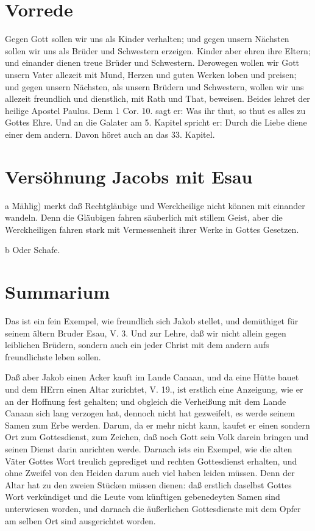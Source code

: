 \section{Vorrede}

Gegen Gott sollen wir uns als Kinder verhalten; und gegen unsern Nächsten sollen wir uns als Brüder und Schwestern erzeigen. Kinder aber ehren ihre Eltern; und einander dienen treue Brüder und Schwestern. Derowegen wollen wir Gott unsern Vater allezeit mit Mund, Herzen und guten Werken loben und preisen; und gegen unsern Nächsten, als unsern Brüdern und Schwestern, wollen wir uns allezeit freundlich und dienstlich, mit Rath und That, beweisen. Beides lehret der heilige Apostel Paulus. Denn 1 Cor. 10. sagt er: Was ihr thut, so thut es alles zu Gottes Ehre. Und an die Galater am 5. Kapitel spricht er: Durch die Liebe diene einer dem andern. Davon höret auch an das 33. Kapitel.

\section{Versöhnung Jacobs mit Esau}

a Mählig) merkt daß Rechtgläubige und Werckheilige nicht können mit einander wandeln. Denn die Gläubigen fahren säuberlich mit stillem Geist, aber die Werckheiligen fahren stark mit Vermessenheit ihrer Werke in Gottes Gesetzen.

b Oder Schafe.

\section{Summarium}

Das ist ein fein Exempel, wie freundlich sich Jakob stellet, und demüthiget für seinem ältern Bruder Esau, V. 3. Und zur Lehre, daß wir nicht allein gegen leiblichen Brüdern, sondern auch ein jeder Christ mit dem andern aufs freundlichste leben sollen.

Daß aber Jakob einen Acker kauft im Lande Canaan, und da eine Hütte bauet und dem HErrn einen Altar zurichtet, V. 19., ist erstlich eine Anzeigung, wie er an der Hoffnung fest gehalten; und obgleich die Verheißung mit dem Lande Canaan sich lang verzogen hat, dennoch nicht hat gezweifelt, es werde seinem Samen zum Erbe werden. Darum, da er mehr nicht kann, kaufet er einen sondern Ort zum Gottesdienst, zum Zeichen, daß noch Gott sein Volk darein bringen und seinen Dienst darin anrichten werde. Darnach ists ein Exempel, wie die alten Väter Gottes Wort treulich geprediget und rechten Gottesdienst erhalten, und ohne Zweifel von den Heiden darum auch viel haben leiden müssen. Denn der Altar hat zu den zweien Stücken müssen dienen: daß erstlich daselbst Gottes Wort verkündiget und die Leute vom künftigen gebenedeyten Samen sind unterwiesen worden, und darnach die äußerlichen Gottesdienste mit dem Opfer am selben Ort sind ausgerichtet worden.

